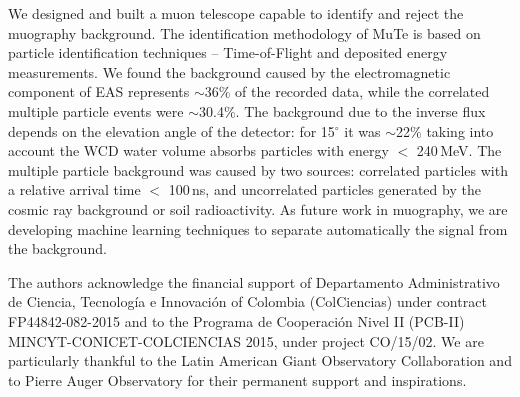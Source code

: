 \documentclass{PoS}
\begin{document}
We designed and built a muon telescope capable to identify and reject the muography background. The identification methodology of MuTe is based on particle identification techniques -- Time-of-Flight and deposited energy measurements.
We found the background caused by the electromagnetic component of EAS represents $\sim$36$\%$ of the recorded data, while the correlated multiple particle events were $\sim$30.4$\%$. The background due to the inverse flux depends on the elevation angle of the detector: for 15$^{\circ}$ it was $\sim$22$\%$ taking into account the WCD water volume absorbs particles with energy $<$ 240\,MeV. The multiple particle background was caused by two sources: correlated particles with a relative arrival time $<$ 100\,ns, and uncorrelated particles generated by the cosmic ray background or soil radioactivity. As future work in muography, we are developing machine learning techniques to separate automatically the signal from the background.


\acknowledgments
The authors acknowledge the financial support of  Departamento Administrativo de Ciencia, Tecnolog\'ia e Innovaci\'on of Colombia (ColCiencias) under contract FP44842-082-2015 and to the Programa de Cooperaci\'on Nivel II (PCB-II) MINCYT-CONICET-COLCIENCIAS 2015, under project CO/15/02. We are particularly thankful to the Latin American Giant Observatory Collaboration and to Pierre Auger Observatory for their permanent support and inspirations. 





\end{document}
